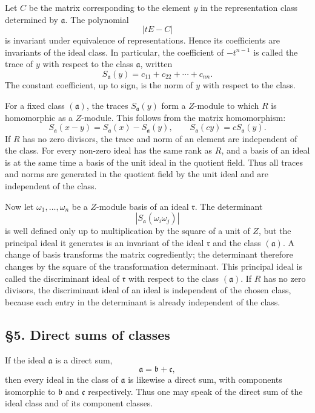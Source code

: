 \documentclass[11pt]{article}
\begin{document}
Let \(C\) be the matrix corresponding to the element \(y\) in the
representation class determined by \(\mathfrak a\). The polynomial \[
  |tE-C|
\] is invariant under equivalence of representations. Hence its
coefficients are invariants of the ideal class. In particular, the
coefficient of \(-t^{n-1}\) is called the trace of \(y\) with respect to
the class \(\mathfrak a\), written \[
  S_{\mathfrak a}(y)=c_{11}+c_{22}+
\cdots+c_{nn}.
\] The constant coefficient, up to sign, is the norm of \(y\) with
respect to the class.

For a fixed class \((\mathfrak a)\), the traces \(S_{\mathfrak a}(y)\)
form a \(Z\)-module to which \(R\) is homomorphic as a \(Z\)-module.
This follows from the matrix homomorphism: \[
  S_{\mathfrak a}(x-y)=S_{\mathfrak a}(x)-S_{\mathfrak a}(y),
  \qquad
  S_{\mathfrak a}(cy)=cS_{\mathfrak a}(y).
\] If \(R\) has no zero divisors, the trace and norm of an element are
independent of the class. For every non-zero ideal has the same rank as
\(R\), and a basis of an ideal is at the same time a basis of the unit
ideal in the quotient field. Thus all traces and norms are generated in
the quotient field by the unit ideal and are independent of the class.

Now let \(\omega_1,
\ldots,
\omega_n\) be a \(Z\)-module basis of an ideal \(\mathfrak r\). The
determinant \[
  |S_{\mathfrak a}(\omega_i\omega_j)|
\] is well defined only up to multiplication by the square of a unit of
\(Z\), but the principal ideal it generates is an invariant of the ideal
\(\mathfrak r\) and the class \((\mathfrak a)\). A change of basis
transforms the matrix cogrediently; the determinant therefore changes by
the square of the transformation determinant. This principal ideal is
called the discriminant ideal of \(\mathfrak r\) with respect to the
class \((\mathfrak a)\). If \(R\) has no zero divisors, the discriminant
ideal of an ideal is independent of the chosen class, because each entry
in the determinant is already independent of the class.

\subsection{§5. Direct sums of classes}\label{direct-sums-of-classes}

If the ideal \(\mathfrak a\) is a direct sum, \[
  \mathfrak a=\mathfrak b+\mathfrak c,
\] then every ideal in the class of \(\mathfrak a\) is likewise a direct
sum, with components isomorphic to \(\mathfrak b\) and \(\mathfrak c\)
respectively. Thus one may speak of the direct sum of the ideal class
and of its component classes.
\end{document}
